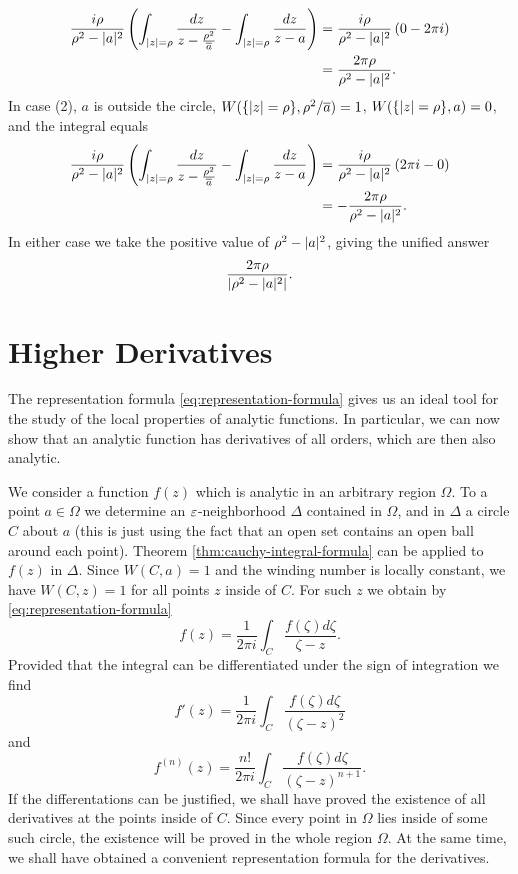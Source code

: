 \begin{exercise}
\begin{sol}
\begin{enumerate}
\begin{align*}
\dfrac{i\rho}{\rho^2-\lvert a \rvert^2}\left(\int_{\lvert z \rvert=\rho}\dfrac{dz}{z-\frac{\rho^2}{\overline{a}}}-\int_{\lvert z \rvert=\rho}\dfrac{dz}{z-a}\right) &= \dfrac{i\rho}{\rho^2-\lvert a \rvert^2}\left(0-2\pi i\right) \\
&=\frac{2\pi \rho}{\rho^2-\lvert a \rvert^2}.
\end{align*}
In case (2), $a$ is outside the circle, $W(\{\lvert z \rvert=\rho\},\rho^2/\overline{a})=1$, $W(\{\lvert z \rvert=\rho\},a)=0$, and the integral equals
\begin{align*}
\dfrac{i\rho}{\rho^2-\lvert a \rvert^2}\left(\int_{\lvert z \rvert=\rho}\dfrac{dz}{z-\frac{\rho^2}{\overline{a}}}-\int_{\lvert z \rvert=\rho}\dfrac{dz}{z-a}\right) &= \dfrac{i\rho}{\rho^2-\lvert a \rvert^2}\left(2\pi i-0\right) \\
&=-\frac{2\pi \rho}{\rho^2-\lvert a \rvert^2}.
\end{align*}
In either case we take the positive value of $\rho^2-\lvert a \rvert^2$, giving the unified answer $$\dfrac{2\pi \rho}{\lvert \rho^2-\lvert a \rvert^2 \rvert}.$$
\end{enumerate}
\end{sol}
\end{exercise}

\section{Higher Derivatives}
The representation formula \ref{eq:representation-formula} gives us an ideal tool for the study of the local properties of analytic functions. In particular, we can now show that an analytic function has derivatives of all orders, which are then also analytic.

We consider a function $f(z)$ which is analytic in an arbitrary region $\Omega$. To a point $a \in \Omega$ we determine an $\varepsilon$-neighborhood $\Delta$ contained in $\Omega$, and in $\Delta$ a circle $C$ about $a$ (this is just using the fact that an open set contains an open ball around each point). Theorem \ref{thm:cauchy-integral-formula} can be applied to $f(z)$ in $\Delta$. Since $W(C,a)=1$ and the winding number is locally constant, we have $W(C,z)=1$ for all points $z$ inside of $C$. For such $z$ we obtain by \ref{eq:representation-formula} $$f(z)=\dfrac{1}{2\pi i}\int_{C} \dfrac{f(\zeta)d\zeta}{\zeta-z}.$$ Provided that the integral can be differentiated under the sign of integration we find
\begin{equation}
\label{eq:first-derivative}
f'(z)=\dfrac{1}{2\pi i}\int_{C} \dfrac{f(\zeta)d\zeta}{(\zeta-z)^2}
\end{equation}
and 
\begin{equation}
\label{eq:higher-derivatives}
f^{(n)}(z)=\dfrac{n!}{2\pi i}\int_{C} \dfrac{f(\zeta)d\zeta}{(\zeta-z)^{n+1}}.
\end{equation}
If the differentations can be justified, we shall have proved the existence of all derivatives at the points inside of $C$. Since every point in $\Omega$ lies inside of some such circle, the existence will be proved in the whole region $\Omega$. At the same time, we shall have obtained a convenient representation formula for the derivatives.

